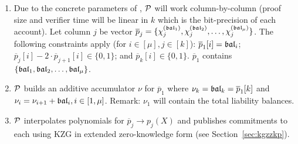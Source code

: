 \begin{Protocol*}[t!]
\begin{framed}
\begin{enumerate}
        \item Due to the concrete parameters of \bls, $\mathcal{P}$ will work column-by-column (proof size and verifier time will be linear in $k$ which is the bit-precision of each account). Let column $j$ be vector $\overline{p}_j=\{\chi_j^{(\mathfrak{bal}_1)},\chi_j^{(\mathfrak{bal}_2)},\dots,\chi_j^{(\mathfrak{bal}_\mu)}\}$. The following constraints apply (for $i\in[\mu],j\in[k]$):       $\overline{p}_1[i]=\mathfrak{bal}_i$; $\overline{p}_j[i] - 2\cdot\overline{p}_{j+1}[i]\in\{0,1\}$; and $\overline{p}_k[i]\in\{0,1\}$. $\overline{p}_1$ contains $\{\mathfrak{bal}_1,\mathfrak{bal}_2,\dots,\mathfrak{bal}_\mu\}$.
        
        
        \item  $\mathcal{P}$ builds an additive accumulator $\nu$ for $\overline{p}_1$ where $\nu_k=\mathfrak{bal}_k=\overline{p}_1[k]$ and $\nu_i=\nu_{i+1}+\mathfrak{bal}_i,i\in[1,\mu]$. Remark: $\nu_1$ will contain the total liability balances. 
        
	 \item $\mathcal{P}$ interpolates polynomials for $\overline{p}_j \rightarrow p_j(X)$ and publishes commitments to each using KZG in extended zero-knowledge form (see Section~\ref{sec:kgzzkp}).
 

\end{enumerate}
\end{framed}
\end{Protocol*}
